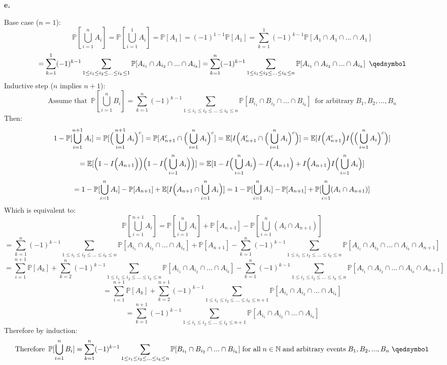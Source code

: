 \documentclass{article}
\begin{document}
\newpage
{\Large\textbf{e.}}
\begin{center}
\doublespacing
    Base case ($n = 1$):
    \[\mathbb{P}[\bigcup_{i=1}^n A_i] =\mathbb{P}[\bigcup_{i=1}^1 A_i] =\mathbb{P}[A_1] = (-1)^{1-1}\mathbb{P}[A_1] =\sum_{k=1}^1 (-1)^{k-1}\mathbb{P}[A_1\cap A_1\cap ...\cap A_1]\]
    \[=\sum_{k=1}^1 (-1)^{k-1}\sum_{1\leq i_1\leq i_2\leq ...\leq i_k\leq 1}\mathbb{P}[A_{i_1}\cap A_{i_2}\cap ...\cap A_{i_k}] =\sum_{k=1}^n (-1)^{k-1}\sum_{1\leq i_1\leq i_2\leq ...\leq i_k\leq n}\mathbb{P}[A_{i_1}\cap A_{i_2}\cap ...\cap A_{i_k}]\;\:\qedsymbol\]
    Inductive step ($n$ implies $n+1$):
    \[\mbox{Assume that}\;\:\mathbb{P}[\bigcup_{i=1}^n B_i] =\sum_{k=1}^n (-1)^{k-1}\sum_{1\leq i_1\leq i_2\leq ...\leq i_k\leq n}\mathbb{P}[B_{i_1}\cap B_{i_2}\cap ...\cap B_{i_k}]\;\:\mbox{for arbitrary}\;B_1, B_2, ..., B_n\]
    Then:
    \[1 -\mathbb{P}[\bigcup_{i=1}^{n+1} A_i] =\mathbb{P}[\Big{(}\bigcup_{i=1}^{n+1} A_i\Big{)}^c] =\mathbb{P}[A_{n+1}^c\cap\Big{(}\bigcup_{i=1}^{n} A_i\Big{)}^c] =\mathbb{E}[I\Big{(}A_{n+1}^c\cap\Big{(}\bigcup_{i=1}^{n} A_i\Big{)}^c\Big{)}] =\mathbb{E}[I\Big{(}A_{n+1}^c\Big{)} I\Big{(}\Big{(}\bigcup_{i=1}^{n} A_i\Big{)}^c\Big{)}]\]
    \[=\mathbb{E}[\Big{(}1 - I\Big{(}A_{n+1}\Big{)}\Big{)}\Big{(}1 - I\Big{(}\bigcup_{i=1}^{n} A_i\Big{)}\Big{)}] =\mathbb{E}[1 - I\Big{(}\bigcup_{i=1}^{n} A_i\Big{)} - I\Big{(}A_{n+1}\Big{)} + I\Big{(}A_{n+1}\Big{)} I\Big{(}\bigcup_{i=1}^{n} A_i\Big{)}]\]
    \[= 1 -\mathbb{P}[\bigcup_{i=1}^{n} A_i] -\mathbb{P}[A_{n+1}] +\mathbb{E}[I\Big{(}A_{n+1}\cap\bigcup_{i=1}^{n} A_i\Big{)}] = 1 -\mathbb{P}[\bigcup_{i=1}^{n} A_i] -\mathbb{P}[A_{n+1}] +\mathbb{P}[\bigcup_{i=1}^{n} (A_i\cap A_{n+1})]\]
    Which is equivalent to:
    \[\mathbb{P}[\bigcup_{i=1}^{n+1} A_i] =\mathbb{P}[\bigcup_{i=1}^{n} A_i] +\mathbb{P}[A_{n+1}] -\mathbb{P}[\bigcup_{i=1}^{n} (A_i\cap A_{n+1})]\]
    \[=\sum_{k=1}^n (-1)^{k-1}\sum_{1\leq i_1\leq i_2\leq ...\leq i_k\leq n}\mathbb{P}[A_{i_1}\cap A_{i_2}\cap ...\cap A_{i_k}] +\mathbb{P}[A_{n+1}] -\sum_{k=1}^n (-1)^{k-1}\sum_{1\leq i_1\leq i_2\leq ...\leq i_k\leq n}\mathbb{P}[A_{i_1}\cap A_{i_2}\cap ...\cap A_{i_k}\cap A_{n+1}]\]
    \[=\sum_{i=1}^{n+1}\mathbb{P}[A_k] +\sum_{k=2}^n (-1)^{k-1}\sum_{1\leq i_1\leq i_2\leq ...\leq i_k\leq n}\mathbb{P}[A_{i_1}\cap A_{i_2}\cap ...\cap A_{i_k}] -\sum_{k=1}^n (-1)^{k-1}\sum_{1\leq i_1\leq i_2\leq ...\leq i_k\leq n}\mathbb{P}[A_{i_1}\cap A_{i_2}\cap ...\cap A_{i_k}\cap A_{n+1}]\]
    \[=\sum_{i=1}^{n+1}\mathbb{P}[A_k] +\sum_{k=2}^{n+1} (-1)^{k-1}\sum_{1\leq i_1\leq i_2\leq ...\leq i_k\leq n+1}\mathbb{P}[A_{i_1}\cap A_{i_2}\cap ...\cap A_{i_k}]\]
    \[=\sum_{k=1}^{n+1} (-1)^{k-1}\sum_{1\leq i_1\leq i_2\leq ...\leq i_k\leq n+1}\mathbb{P}[A_{i_1}\cap A_{i_2}\cap ...\cap A_{i_k}]\]
    Therefore by induction:
    \[\mbox{Therefore}\;\:\mathbb{P}[\bigcup_{i=1}^n B_i] =\sum_{k=1}^n (-1)^{k-1}\sum_{1\leq i_1\leq i_2\leq ...\leq i_k\leq n}\mathbb{P}[B_{i_1}\cap B_{i_2}\cap ...\cap B_{i_k}]\;\mbox{for all}\; n\in\mathbb{N}\;\mbox{and arbitrary events}\;B_1, B_2, ..., B_n\;\qedsymbol\]
\end{center}
\end{document}
